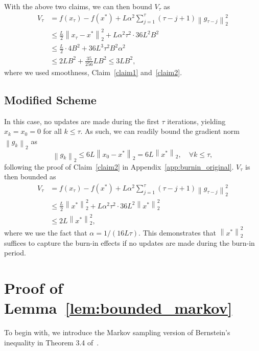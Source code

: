 \documentclass{article}
\theoremstyle{plain}
\theoremstyle{definition}
\newcommand{\norm}[1]{\left\| #1\right\|_{2}}
\begin{document}
With the above two claims, we can then bound $V_\tau$ as
\begin{equation}
\begin{aligned}
    V_\tau&=f(x_\tau) - f(x^*)+L\alpha^2\sum_{j=1}^\tau (\tau-j+1)\norm{g_{\tau-j}}^2\\
    &\leq \frac{L}{2}\norm{x_\tau-x^*}^2+L\alpha^2\tau^2\cdot 36L^2B^2\\
    &\leq \frac{L}{2}\cdot 4B^2 + 36L^3\tau^2B^2\alpha^2\\
    &\leq 2LB^2 + \frac{35}{256}LB^2\leq 3LB^2,\label{eqn:bound_V_tau}
\end{aligned}
\end{equation}
where we used smoothness, Claim~\ref{claim1} and~\ref{claim2}.

\subsection{Modified Scheme}\label{app:burnin_modified}
In this case, no updates are made during the first $\tau$ iterations, yielding $x_k=x_0=0$ for all $k\leq \tau$. As such, we can readily bound the gradient norm $\norm{g_k}$ as
\begin{equation}
    \norm{g_k}\leq 6L\norm{x_0-x^*}=6L\norm{x^*},\quad\forall k\leq \tau,
\end{equation}
following the proof of Claim~\ref{claim2} in Appendix~\ref{app:burnin_original}. $V_\tau$ is then bounded as
\begin{equation}
\begin{aligned}
    V_\tau&=f(x_\tau) - f(x^*)+L\alpha^2\sum_{j=1}^\tau (\tau-j+1)\norm{g_{\tau-j}}^2\\
    &\leq \frac{L}{2}\norm{x^*}^2+L\alpha^2\tau^2\cdot 36L^2\norm{x^*}^2\\
    &\leq 2L\norm{x^*}^2,
\end{aligned}
\end{equation}
where we use the fact that $\alpha=1/(16L\tau)$. This demonstrates that $\norm{x^*}^2$ suffices to capture the burn-in effects if no updates are made during the burn-in period.

\newpage
\section{Proof of Lemma~\ref{lem:bounded_markov}}\label{app:markov}
To begin with, we introduce the Markov sampling version of Bernstein's inequality in Theorem 3.4 of~\citet{paulin2015concentration}. 
\end{document}
